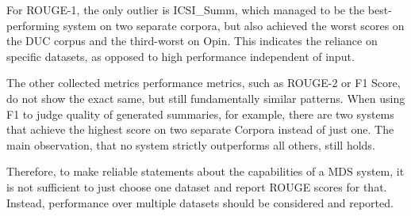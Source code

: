 \documentclass[20_original-paper.tex]{subfiles}
\begin{document}
For ROUGE-1, the only outlier is ICSI\_Summ, which managed to be the  best-performing system on two separate corpora, but also achieved the worst scores on the DUC corpus and the third-worst on Opin.
This indicates the reliance on specific datasets, as opposed to high performance independent of input.\cite{dey-etal-2020-corpora}

The other collected metrics performance metrics, such as ROUGE-2 or F1 Score, do not show the exact same, but still fundamentally similar patterns.
When using F1 to judge quality of generated summaries, for example, there are two systems that achieve the highest score on two separate Corpora instead of just one.
The main observation, that no system strictly outperforms all others, still holds.

Therefore, to make reliable statements about the capabilities of a MDS system,
it is not sufficient to just choose one dataset and report ROUGE scores for that.
Instead, performance over multiple datasets should be considered and reported.
\end{document}
